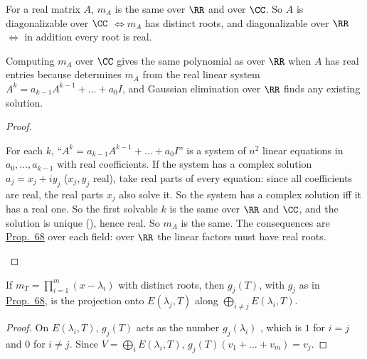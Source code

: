 \documentclass[10pt]{scrartcl}
\begin{document}
\begin{proposition*}\hypertarget{name-f8-real-versus-complex}{}\label{name-f8-real-versus-complex}
  For a real matrix $A$, $m_A$ is the same over $\RR$ and over $\CC$. So $A$ is diagonalizable over $\CC$ $\iff m_A$ has distinct roots, and diagonalizable over $\RR$ $\iff$ in addition every root is real.
\end{proposition*}
\begin{ideabox}
Computing $m_A$ over $\CC$ gives the same polynomial as over $\RR$ when $A$ has real entries because  determines $m_A$ from the real linear system $A^k=a_{k-1}A^{k-1}+\dots+a_0I$, and Gaussian elimination over $\RR$ finds any existing solution.
\end{ideabox}
\begin{proof}
  \begin{steps}
    \ii For each $k$, ``$A^k=a_{k-1}A^{k-1}+\dots+a_0I$'' is a system of $n^2$ linear equations in $a_0,\dots,a_{k-1}$ with real coefficients.
    \ii If the system has a complex solution $a_j=x_j+iy_j$ ($x_j,y_j$ real), take real parts of every equation: since all coefficients are real, the real parts $x_j$ also solve it. So the system has a complex solution iff it has a real one.
    \ii So the first solvable $k$ is the same over $\RR$ and $\CC$, and the solution is unique (), hence real. So $m_A$ is the same.
    \ii The consequences are \hyperref[prop-68]{Prop.~68} over each field: over $\RR$ the linear factors must have real roots.
  \end{steps}
\end{proof}

\begin{proposition*}\hypertarget{name-f9-projections-onto-eigenspaces-hw7-p7}{}\label{name-f9-projections-onto-eigenspaces-hw7-p7}
  If $m_T=\prod_{i=1}^m(x-\lambda_i)$ with distinct roots, then $g_j(T)$, with $g_j$ as in \hyperref[prop-68]{Prop.~68}, is the projection onto $E(\lambda_j,T)$ along $\bigoplus_{i\ne j}E(\lambda_i,T)$.
\end{proposition*}
\begin{proof}
  On $E(\lambda_i,T)$, $g_j(T)$ acts as the number $g_j(\lambda_i)$ , which is $1$ for $i=j$ and $0$ for $i\ne j$. Since $V=\bigoplus_iE(\lambda_i,T)$, $g_j(T)(v_1+\dots+v_m)=v_j$.
\end{proof}
\end{document}
